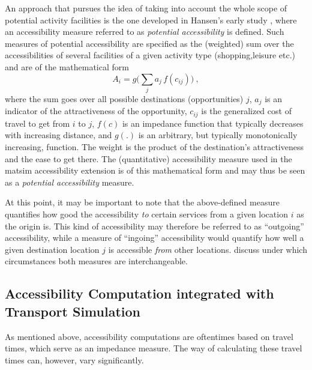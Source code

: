 An approach that pursues the idea of taking into account the whole scope of potential activity facilities is the one 
developed in Hansen's early study \citep{Hansen1959}, where an accessibility 
measure referred to as \textit{potential accessibility} is defined. Such measures of potential accessibility are 
specified as the (weighted) sum over the 
accessibilities of several facilities of a given activity type (\eg shopping,leisure etc.) and are of the mathematical form
\begin{equation}
	A_i = g\Big( \sum_j a_j \, f(c_{ij}) \Big) \ ,
	\label{eq:accessibility:basic}
\end{equation}
where the sum goes over all possible destinations (opportunities) $j$, $a_j$ is an indicator of the attractiveness of 
the opportunity, $c_{ij}$ is the generalized cost of travel to get from $i$ to $j$, $f(c)$ is an impedance function that 
typically decreases with increasing distance, and $g(.)$ is an arbitrary, but typically monotonically increasing, function. 
The weight is the product of the destination's attractiveness and the ease to get there. 
The (quantitative) accessibility measure used 
in the \gls{matsim} accessibility extension is of this mathematical form and may thus be seen 
as a \textit{potential accessibility} measure.


At this point, it may be important to note that the above-defined measure quantifies how good the accessibility \textit{to} 
certain services from a given location $i$ as the origin is. This kind of accessibility may therefore be referred to 
as ``outgoing'' accessibility, while a measure of ``ingoing'' accessibility would quantify how well a given destination 
location $j$ is accessible \textit{from} other locations. \citet{NicolaiNagel2012HiResAccessibilityMethodInBook} 
discuss under which circumstances both measures are interchangeable.

\subsection{Accessibility Computation integrated with Transport Simulation}
As mentioned above, accessibility computations are oftentimes based on travel times, which serve as an impedance 
measure. The way of calculating these travel times can, however, vary significantly.

